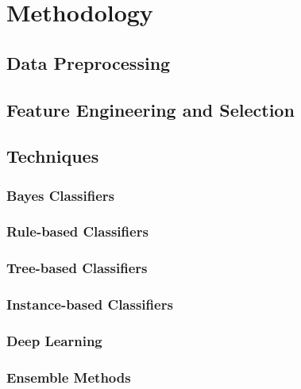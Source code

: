 \section{Methodology}
\label{sec:methodology}


\subsection{Data Preprocessing}



\subsection{Feature Engineering and Selection}


\subsection{Techniques}


\subsubsection*{Bayes Classifiers}

\subsubsection*{Rule-based Classifiers}

\subsubsection*{Tree-based Classifiers}

\subsubsection*{Instance-based Classifiers}

\subsubsection*{Deep Learning}

\subsubsection*{Ensemble Methods}